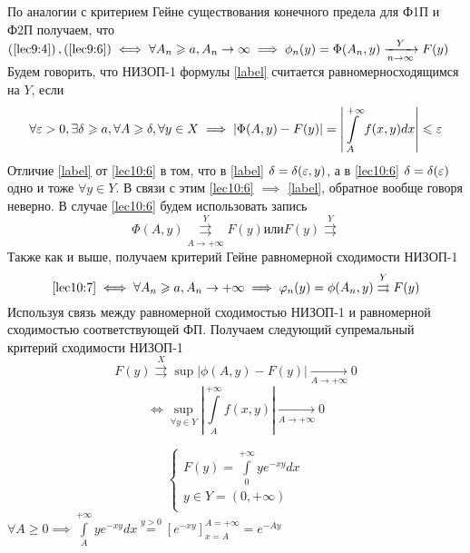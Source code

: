 \documentclass[a4paper,12pt,openany]{report}
\begin{document}
По аналогии с критерием Гейне существования конечного предела для Ф1П и Ф2П 
получаем, что 
$\left(\eqref{lec9:4}\right),\left(\eqref{lec9:6}\right) \iff \forall A_n \ge 
a, A_n \to \infty \implies \phi_n(y) =\Phi(A_n,y) \xrightarrow[n\rightarrow 
\infty]{Y}F(y) $
Будем говорить, что НИЗОП-1 формулы \eqref{label}  считается 
равномерносходящимся на $Y$, если
\begin{equation}
\label{lec10:6}
\forall \eps > 0, \exists \delta \ge a, \forall A \ge \delta, \forall y\in X 
\implies \left| \Phi(A,y) - F(y) \right| = \left| \int\limits_A^{+\infty} 
f(x,y) dx \right| \le \eps
\end{equation}
Отличие \eqref{label} от \eqref{lec10:6} в том, что в \eqref{label} $\delta = 
\delta(\eps,y)$, а в \eqref{lec10:6} $\delta = \delta(\eps)$ одно и тоже 
$\forall y \in Y$. В связи с этим \eqref{lec10:6} $\implies$ \eqref{label}, 
обратное вообще говоря неверно. 
В случае \eqref{lec10:6} будем использовать запись \begin{equation}
\label{lec10:7}
\Phi(A,y)\overset{Y}{\underset{A \to +\infty}{\rightrightarrows}}F(y) или 
F(y)\overset{Y}{\rightrightarrows}
\end{equation}
Также как и выше, получаем критерий Гейне равномерной сходимости НИЗОП-1 
\begin{equation}
\label{lec10:8}
 \eqref{lec10:7} \iff \forall A_n \ge a, A_n\rightarrow +\infty \implies 
 \varphi_n(y) = \phi(A_n,y) \overset{Y}\rightrightarrows F(y) 
\end{equation}
Используя связь между равномерной сходимостью НИЗОП-1 и равномерной 
сходимостью соответствующей ФП. Получаем следующий супремальный критерий 
сходимости НИЗОП-1 
\begin{equation}
\label{lec10:9}
F(y)\overset{X} \rightrightarrows \sup\left|\phi(A , y) - F(y) \right| 
\underset{A \to + \infty}\to 0 \end{equation}
\begin{equation}
\label{lec10:10}\iff \underset{\forall y \in 
Y}\sup\left|\int\limits_A^{+\infty} f(x,y)\right| \underset{A \to + \infty} 
\to 0  \end{equation}

\[ \left\{\begin{array}{rcl}
		F(y)=\int\limits_0^{+\infty}ye^{-xy}dx\\
		y \in Y = (0,+\infty)\\
		\end{array}
		\right. \]
$\forall A \ge 0 \implies \int\limits_A^{+\infty}ye^{-xy}dx \overset{y > 0} = 
\left[e^{-xy} \right]_{x = A}^{A = +\infty} = e^{-Ay} $
\end{document}
